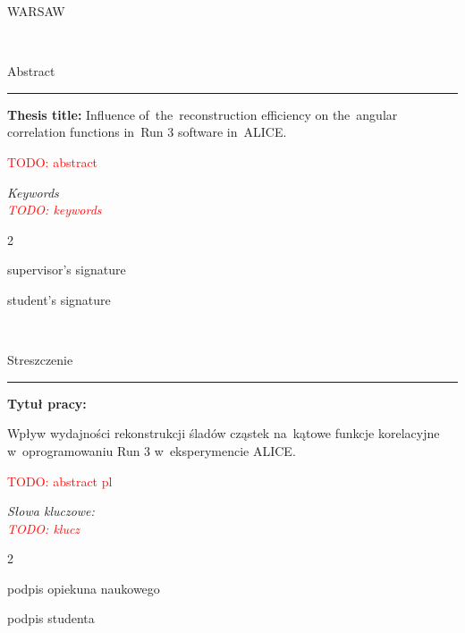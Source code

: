 \documentclass[11pt,a4paper,twoside]{book}
\numberwithin{equation}{chapter}
\newcommand{\todo}[1]{\textcolor{red}{TODO: #1}}
\newcommand{\thesistitle}{Influence of the reconstruction efficiency on the angular correlation functions in Run 3 software in ALICE.}
\newcommand{\thesistitlepl}{\begin{otherlanguage}{polish}
    Wpływ wydajności rekonstrukcji śladów cząstek na kątowe funkcje korelacyjne w oprogramowaniu Run 3 w eksperymencie ALICE.
\end{otherlanguage}}
\begin{document}
\begin{titlepage}
    \vfill

    \begin{minipage}[b]{\textwidth}
        \begin{center}
            {\large WARSAW \the\year{}}
        \end{center}
    \end{minipage}
\end{titlepage}

\newpage
\mbox{ }

\newpage
{\Large Abstract}

{\color{plum}\rule[1pt]{\textwidth}{2pt}}

\textbf{Thesis title:} \thesistitle

\todo{abstract}

\vspace{0.025\textheight}
\textit{Keywords}\\
\textit{\todo{keywords}}

\vfill

\begin{multicols}{2}
    \begin{flushleft}
        supervisor's signature
    \end{flushleft}
    \begin{flushright}
        student's signature
    \end{flushright}
\end{multicols}

\newpage
\mbox{ }

\newpage
\begin{otherlanguage}{polish}
    {\Large Streszczenie}

    {\color{plum}\rule[1pt]{\textwidth}{2pt}}

    \textbf{Tytuł pracy:} \thesistitlepl

    \todo{abstract pl}

    \vspace{0.025\textheight}
    \textit{Słowa kluczowe:}\\
    \textit{\todo{klucz}}

    \vfill

    \begin{multicols}{2}
        \begin{flushleft}
            podpis opiekuna naukowego
        \end{flushleft}
        \begin{flushright}
            podpis studenta
        \end{flushright}
    \end{multicols}
\end{otherlanguage}
\end{document}
